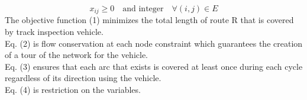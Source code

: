 \documentclass[a4paper,12pt,titlepage]{article}
\begin{document}
	\begin{equation}
	x_{ij}\geq0 \quad \text{and integer} \quad \forall (i,j)\in E
	\end{equation}
	\newpage
	The objective function (1) minimizes the total length of route R that is covered by track inspection vehicle. \\
	Eq. (2) is flow conservation at each node constraint which guarantees the creation of a tour of the network for the vehicle. \\
	Eq. (3) ensures that each arc that exists is covered at least once during each cycle regardless of its direction using the vehicle. \\
	Eq. (4) is restriction on the variables.\\
	\\
	
	
\end{document}
